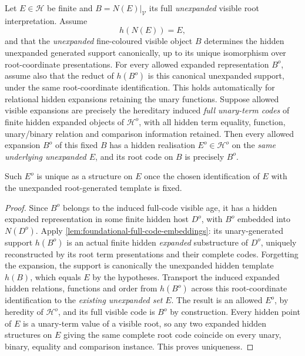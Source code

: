 \begin{lemma}
\label{lem:foundational-same-host-code}
Let $E\in\mathcal H$ be finite and
$B=N(E)|_{\mathcal V}$ its full \emph{unexpanded}
visible root interpretation. Assume
\[
                         h(N(E))=E,
\]
and that the \emph{unexpanded} fine-coloured
visible object $B$ determines the hidden
unexpanded generated support canonically,
up to its unique isomorphism over root-coordinate
presentations. For every allowed expanded representation $B^o$, assume
also that the reduct of $h(B^o)$ is this canonical unexpanded support,
under the same root-coordinate identification. This holds automatically
for relational hidden expansions retaining the unary functions.
Suppose allowed visible expansions
are precisely the hereditary induced \emph{full
unary-term codes} of finite hidden expanded objects
of $\mathcal H^o$, with all hidden term equality,
function, unary/binary relation and comparison
information retained. Then every allowed
expansion $B^o$ of this fixed $B$ has a hidden
realisation $E^o\in\mathcal H^o$ on the
\emph{same underlying unexpanded $E$}, and its
root code on $B$ is precisely $B^o$.

Such $E^o$ is unique as a structure on $E$
once the chosen identification of $E$ with
the unexpanded root-generated template is fixed.
\end{lemma}
\begin{proof}
Since $B^o$ belongs to the induced full-code
visible age, it has a hidden expanded
representation in some finite hidden
host $D^o$, with $B^o$ embedded into
$N(D^o)$. Apply
\cref{lem:foundational-full-code-embeddings}:
its unary-generated support $h(B^o)$
is an actual finite hidden \emph{expanded}
substructure of $D^o$, uniquely reconstructed
by its root term presentations and their complete
codes. Forgetting the expansion, the support is
canonically the unexpanded hidden template $h(B)$,
which equals $E$ by the hypotheses.
Transport the induced expanded hidden relations,
functions and order from $h(B^o)$ across this
root-coordinate identification to the
\emph{existing unexpanded set} $E$. The
result is an allowed $E^o$, by heredity of
$\mathcal H^o$, and its full visible code
is $B^o$ by construction. Every hidden point
of $E$ is a unary-term value of a visible root,
so any two expanded hidden structures on $E$
giving the same complete root code coincide on
every unary, binary, equality and comparison
instance. This proves uniqueness.
\end{proof}

